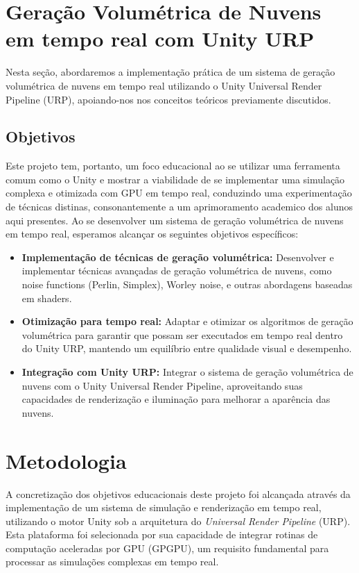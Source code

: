 \section{Geração Volumétrica de Nuvens em tempo real com Unity URP}
Nesta seção, abordaremos a implementação prática de um sistema de geração volumétrica de nuvens em tempo real utilizando o Unity Universal Render Pipeline (URP), apoiando-nos nos conceitos teóricos previamente discutidos. 


\subsection{Objetivos}

Este projeto tem, portanto, um foco educacional ao se utilizar uma ferramenta comum como o Unity e mostrar a viabilidade de se implementar uma simulação complexa e otimizada com GPU em tempo real, conduzindo uma experimentação de técnicas distinas, consonantemente a um aprimoramento academico dos alunos aqui presentes. Ao se desenvolver um sistema de geração volumétrica de nuvens em tempo real, esperamos alcançar os seguintes objetivos específicos:

\begin{itemize}
    \item \textbf{Implementação de técnicas de geração volumétrica:} Desenvolver e implementar técnicas avançadas de geração volumétrica de nuvens, como noise functions (Perlin, Simplex), Worley noise, e outras abordagens baseadas em shaders.
    \item \textbf{Otimização para tempo real:} Adaptar e otimizar os algoritmos de geração volumétrica para garantir que possam ser executados em tempo real dentro do Unity URP, mantendo um equilíbrio entre qualidade visual e desempenho.
    \item \textbf{Integração com Unity URP:} Integrar o sistema de geração volumétrica de nuvens com o Unity Universal Render Pipeline, aproveitando suas capacidades de renderização e iluminação para melhorar a aparência das nuvens.
\end{itemize}

\section{Metodologia}
\label{sec:metodologia}

A concretização dos objetivos educacionais deste projeto foi alcançada através da implementação de um sistema de simulação e renderização em tempo real, utilizando o motor Unity sob a arquitetura do \textit{Universal Render Pipeline} (URP). Esta plataforma foi selecionada por sua capacidade de integrar rotinas de computação aceleradas por GPU (GPGPU), um requisito fundamental para processar as simulações complexas em tempo real.

